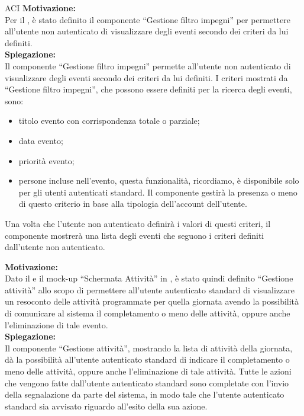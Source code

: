 \begin{listaPersonale}{ACI}
    \textbf{Motivazione:}\\
    Per il , è stato definito il componente “Gestione filtro impegni” per permettere all'utente non autenticato di visualizzare degli eventi secondo dei criteri da lui definiti.\\
    \textbf{Spiegazione:}\\
    Il componente “Gestione filtro impegni” permette all'utente non autenticato di visualizzare degli eventi secondo dei criteri da lui definiti. I criteri mostrati da “Gestione filtro impegni”, che possono essere definiti per la ricerca degli eventi, sono:
    \begin{itemize}
        \item titolo evento con corrispondenza totale o parziale;
        \item data evento;
        \item priorità evento;
        \item persone incluse nell'evento, questa funzionalità, ricordiamo, è disponibile solo per gli utenti autenticati standard. Il componente gestirà la presenza o meno di questo criterio in base alla tipologia dell'account dell'utente.
    \end{itemize}
    Una volta che l'utente non autenticato definirà i valori di questi criteri, il componente mostrerà una lista degli eventi che seguono i criteri definiti dall'utente non autenticato.



    \textbf{Motivazione:}\\
    Dato il  e il mock-up “Schermata Attività” in , è stato quindi definito “Gestione attività” allo scopo di permettere all'utente autenticato standard di visualizzare un resoconto delle attività programmate per quella giornata avendo la possibilità di comunicare al sistema il completamento o meno delle attività, oppure anche l'eliminazione di tale evento.\\
    \textbf{Spiegazione:}\\
    Il componente “Gestione attività”, mostrando la lista di attività della giornata, dà la possibilità all'utente autenticato standard di indicare il completamento o meno delle attività, oppure anche l'eliminazione di tale attività. Tutte le azioni che vengono fatte dall'utente autenticato standard sono completate con l'invio della segnalazione da parte del sistema, in modo tale che l'utente autenticato standard sia avvisato riguardo all'esito della sua azione.



\end{listaPersonale}
